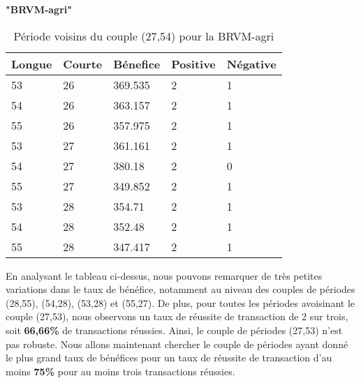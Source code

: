 \begin{itemize}
\begin{itemize}
\begin{center}
    \textbf{"BRVM-agri" }
\end{center}
\begin{table}[ht]
    \centering
    \caption{Période voisins du couple (27,54) pour la BRVM-agri}
    \begin{tabular}{p{2cm}p{2cm}p{2cm}p{2cm}p{1.5cm}}
        \hline
        Longue & Courte & Bénefice & Positive &Négative \\
        \hline
        53	&26	&369.535	&2	&1	\\ 
        54	&26	&363.157	&2	&1	\\ 
        55	&26	&357.975	&2	&1	\\ 
        53	&27	&361.161	&2	&1	\\ \hline
        \cellcolor{myblue}54	&\cellcolor{myblue}27	&\cellcolor{myblue}380.18	    &\cellcolor{myblue}2	&\cellcolor{myblue}0	\\ \hline
        55	&27	&349.852	&2	&1	\\ 
        53	&28	&354.71	    &2	&1	\\ 
        54	&28	&352.48	    &2	&1	\\ 
        55	&28	&347.417	&2	&1	\\ 
            \hline
    \end{tabular}
\end{table}%

\par{En analysant le tableau ci-dessus, nous pouvons remarquer de très petites variations dans le taux de bénéfice, 
notamment au niveau des couples de périodes (28,55), (54,28), (53,28) et (55,27). De plus, pour toutes les 
périodes avoisinant le couple (27,53), nous observons un taux de réussite de transaction de 2 sur trois, soit 
\textbf{66,66\%} de transactions réussies. Ainsi, le couple de périodes (27,53) n'est pas robuste. Nous allons
maintenant chercher le couple de périodes ayant donné le plus grand taux de bénéfices pour un 
taux de réussite de transaction d'au moins \textbf{75\%} pour au moins trois transactions réussies.}


\end{itemize}
\end{itemize}
